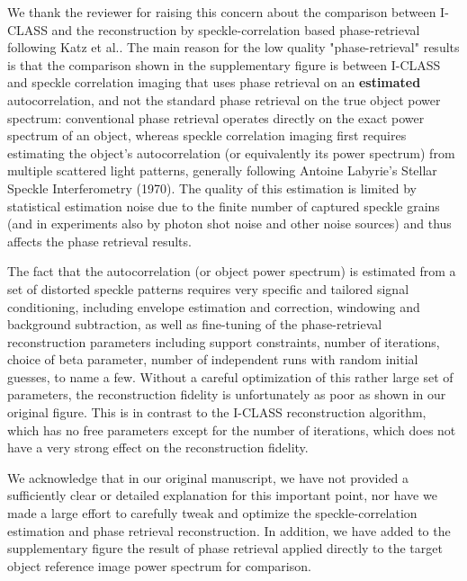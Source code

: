 \documentclass[12pt]{article}
\newenvironment{finished_ourresponse}
    {\begin{tcolorbox}[width=\linewidth,breakable,enhanced,colback=gray!5,colframe=finished_responsecolor!50,title=Response,left=5pt,right=5pt]}
    {\end{tcolorbox}}
\begin{document}
\begin{finished_ourresponse}
        We thank the reviewer for raising this concern about the comparison between I-CLASS and the reconstruction by speckle-correlation based phase-retrieval following Katz et al.\cite{katz14}. The main reason for the low quality "phase-retrieval" results is that the comparison shown in the supplementary figure is between I-CLASS and speckle correlation imaging that uses phase retrieval on an \textbf{estimated} autocorrelation, and not the standard phase retrieval on the true object power spectrum: conventional phase retrieval operates directly on the exact power spectrum of an object, whereas speckle correlation imaging first requires estimating the object's autocorrelation (or equivalently its power spectrum) from multiple scattered light patterns, generally following Antoine Labyrie's Stellar Speckle Interferometry (1970)\cite{labeyrie1970attainment}. The quality of this estimation is limited by statistical estimation noise due to the finite number of captured speckle grains (and in experiments also by photon shot noise and other noise sources) and thus affects the phase retrieval results.

    The fact that the autocorrelation (or object power spectrum) is estimated from a set of distorted speckle patterns requires very specific and tailored signal conditioning, including envelope estimation and correction, windowing and background subtraction, as well as fine-tuning of the phase-retrieval reconstruction parameters including support constraints, number of iterations, choice of beta parameter, number of independent runs with random initial guesses, to name a few. Without a careful optimization of this rather large set of parameters, the reconstruction fidelity is unfortunately as poor as shown in our original figure. This is in contrast to the I-CLASS reconstruction algorithm, which has no free parameters except for the number of iterations, which does not have a very strong effect on the reconstruction fidelity.
    
    We acknowledge that in our original manuscript, we have not provided a sufficiently clear or detailed explanation for this important point, nor have we made a large effort to carefully tweak and optimize the speckle-correlation estimation and phase retrieval reconstruction. In addition, we have added to the supplementary figure the result of phase retrieval applied directly to the target object reference image power spectrum for comparison. 
    

\end{finished_ourresponse}
\end{document}
